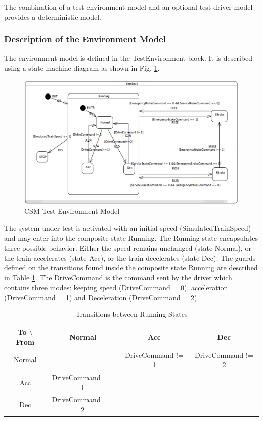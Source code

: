 The combination of a test environment model and an optional test driver
model provides a deterministic model. 

\subsubsection{Description of the Environment Model}
The environment model is defined in the TestEnvironment block. It is
described using a state machine diagram as shown in
Fig. \ref{fig:env}.

\begin{figure}[ht!]
	\centering
	\includegraphics[height=0.34\textheight]{figures/env}
	\caption{CSM Test Environment Model}
    \label{fig:env}
\end{figure}

The system under test is activated with an initial speed
(SimulatedTrainSpeed) and may enter into the composite state Running.
The Running state encapsulates three possible behavior. Either the
speed remains unchanged (state Normal), or the train accelerates
(state Acc), or the train decelerates (state Dec). The guards defined
on the transitions found inside the composite state Running are
described in Table \ref{tab:runningtr}. The DriveCommand is the
command sent by the driver which contains three modes: keeping speed
(DriveCommand = 0), acceleration (DriveCommand = 1) and Deceleration
(DriveCommand = 2).

\begin{table}[ht!]
\footnotesize
	\caption{Transitions between Running States}
	\begin{center}
    \begin{tabular}{|c|c|c|c|}
    \hline
    To $\setminus$ From  & Normal & Acc & Dec \\
    \hline
    Normal &   &  DriveCommand != 1  & DriveCommand != 2\\
    \hline
    Acc  & DriveCommand == 1 & &  \\
    \hline
    Dec  & DriveCommand == 2 & & \\
	\hline
    \end{tabular}
    \end{center}
\label{tab:runningtr}
\end{table} 

